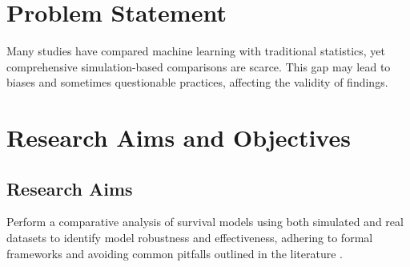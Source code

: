 

\section{Problem Statement}
\noindent Many studies have compared machine learning with traditional statistics, yet comprehensive simulation-based comparisons are scarce. This gap may lead to biases and sometimes questionable practices, affecting the validity of findings.

\section{Research Aims and Objectives}
\subsection{Research Aims}
\noindent Perform a comparative analysis of survival models using both simulated and real datasets to identify model robustness and effectiveness, adhering to formal frameworks \parencite{morris_using_2019} and avoiding common pitfalls outlined in the literature \parencite{pawel_pitfalls_2024}.
